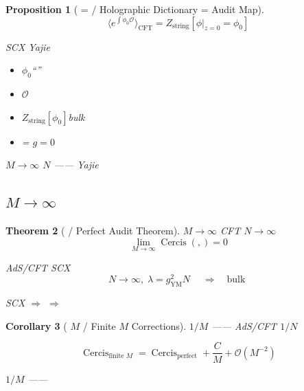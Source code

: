 \documentclass[12pt,a4paper]{article}
\theoremstyle{plain}
\newtheorem{theorem}{ Theorem}[section]
\newtheorem{proposition}[theorem]{ Proposition}
\newtheorem{corollary}[theorem]{ Corollary}
\theoremstyle{definition}
\newcommand{\Ocal}{\mathcal{O}}
\DeclareMathOperator{\Cercis}{Cercis}
\begin{document}
\begin{proposition}[ =  / Holographic Dictionary = Audit Map]

\begin{equation}
    \langle e^{\int \phi_0 \Ocal} \rangle_{\text{CFT}} =
    Z_{\text{string}}[\phi|_{z=0} = \phi_0]
\end{equation}

 SCX  Yajie 
\begin{itemize}
    \item $\phi_0$\textbf{}``''
    \item $\Ocal$\textbf{}
    \item $Z_{\text{string}}[\phi_0]$bulk \textbf{}
    \item  = $g=0$
\end{itemize}

 $M \to \infty$ $N$ \textbf{}——
Yajie 
\end{proposition}


\subsection{$M \to \infty$}

\begin{theorem}[ / Perfect Audit Theorem]
 $M \to \infty$ CFT  $N \to \infty$ 
\begin{equation}
    \lim_{M \to \infty} \Cercis(\text{}, \text{}) = 0
\end{equation}

 AdS/CFT  SCX 
\begin{equation}
    N \to \infty, \; \lambda = g_{\text{YM}}^2 N \; \text{}
    \quad \Longrightarrow \quad
    \text{bulk }
\end{equation}

 SCX  $\Longrightarrow$  $\Longrightarrow$ 
\end{theorem}

\begin{corollary}[ $M$  / Finite $M$ Corrections]
 $1/M$ —— AdS/CFT  $1/N$ 

\begin{equation}
    \Cercis_{\text{finite } M} = \Cercis_{\text{perfect}} + \frac{C}{M} + \Ocal(M^{-2})
\end{equation}

$1/M$ \textbf{}——
\end{corollary}
\end{document}

